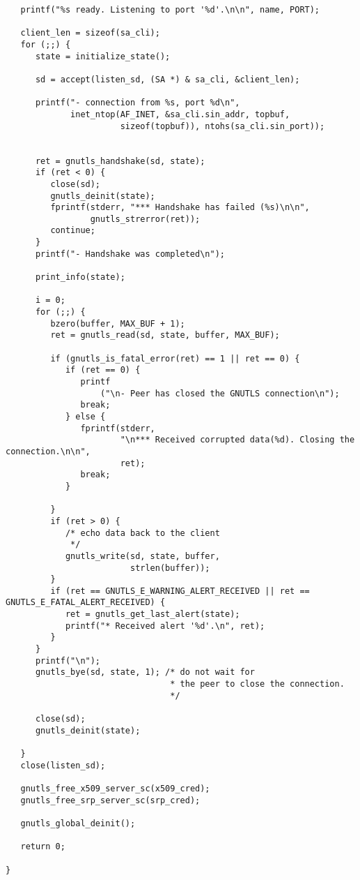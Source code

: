 \begin{verbatim}
   printf("%s ready. Listening to port '%d'.\n\n", name, PORT);

   client_len = sizeof(sa_cli);
   for (;;) {
      state = initialize_state();

      sd = accept(listen_sd, (SA *) & sa_cli, &client_len);

      printf("- connection from %s, port %d\n",
             inet_ntop(AF_INET, &sa_cli.sin_addr, topbuf,
                       sizeof(topbuf)), ntohs(sa_cli.sin_port));


      ret = gnutls_handshake(sd, state);
      if (ret < 0) {
         close(sd);
         gnutls_deinit(state);
         fprintf(stderr, "*** Handshake has failed (%s)\n\n",
                 gnutls_strerror(ret));
         continue;
      }
      printf("- Handshake was completed\n");

      print_info(state);

      i = 0;
      for (;;) {
         bzero(buffer, MAX_BUF + 1);
         ret = gnutls_read(sd, state, buffer, MAX_BUF);

         if (gnutls_is_fatal_error(ret) == 1 || ret == 0) {
            if (ret == 0) {
               printf
                   ("\n- Peer has closed the GNUTLS connection\n");
               break;
            } else {
               fprintf(stderr,
                       "\n*** Received corrupted data(%d). Closing the connection.\n\n",
                       ret);
               break;
            }

         }
         if (ret > 0) {
            /* echo data back to the client
             */
            gnutls_write(sd, state, buffer,
                         strlen(buffer));
         }
         if (ret == GNUTLS_E_WARNING_ALERT_RECEIVED || ret == GNUTLS_E_FATAL_ALERT_RECEIVED) {
            ret = gnutls_get_last_alert(state);
            printf("* Received alert '%d'.\n", ret);
         }
      }
      printf("\n");
      gnutls_bye(sd, state, 1); /* do not wait for
                                 * the peer to close the connection.
                                 */

      close(sd);
      gnutls_deinit(state);

   }
   close(listen_sd);

   gnutls_free_x509_server_sc(x509_cred);
   gnutls_free_srp_server_sc(srp_cred);

   gnutls_global_deinit();

   return 0;

}

\end{verbatim}
